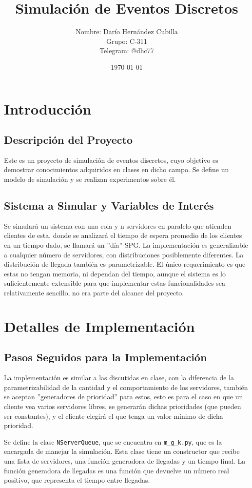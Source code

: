 \documentclass{article}
\title{Simulación de Eventos Discretos}
\author{Nombre: Darío Hernández Cubilla \\ Grupo: C-311 \\ Telegram: @dhc77}
\date{\today}
\begin{document}
\maketitle


\section{Introducción}
\subsection{Descripción del Proyecto}
Este es un proyecto de simulación de eventos discretos, cuyo objetivo es demostrar conocimientos adquiridos en clases en dicho campo. Se define un modelo de simulación y se realizan experimentos sobre él.
\subsection{Sistema a Simular y Variables de Interés}
Se simulará un sistema con una cola y n servidores en paralelo que atienden clientes de esta, donde se analizará el tiempo de espera promedio de los clientes en un tiempo dado, se llamará un ''día'' SPG. La implementación es generalizable a cualquier número de servidores, con distribuciones posiblemente diferentes. La distribución de llegada también es parametrizable. El único requerimiento es que estas no tengan memoria, ni dependan del tiempo, aunque el sistema es lo suficientemente extensible para que implementar estas funcionalidades sea relativamente sencillo, no era parte del alcance del proyecto.

\section{Detalles de Implementación}
\subsection{Pasos Seguidos para la Implementación}
La implementación es similar a las discutidas en clase, con la diferencia de la parametrizabilidad de la cantidad y el comportamiento de los servidores, también se aceptan ''generadores de prioridad'' para estos, esto es para el caso en que un cliente vea varios servidores libres, se generarán dichas prioridades (que pueden ser constantes), y el cliente elegirá el que tenga un valor mínimo de dicha prioridad.

Se define la clase \texttt{NServerQueue}, que se encuentra en \texttt{m\_g\_k.py}, que es la encargada de manejar la simulación. Esta clase tiene un constructor que recibe una lista de servidores, una función generadora de llegadas y un tiempo final. La función generadora de llegadas es una función que devuelve un número real positivo, que representa el tiempo entre llegadas.
\end{document}

